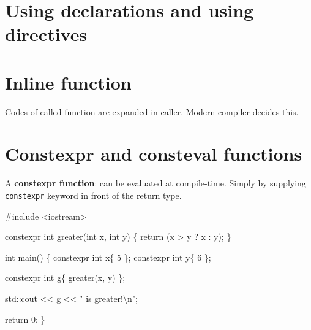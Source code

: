 \documentclass[
  letterpaper,
  DIV=11,
  numbers=noendperiod]{scrreprt}
\newenvironment{Shaded}{\begin{snugshade}}{\end{snugshade}}
\newcommand{\CommentTok}[1]{\textcolor[rgb]{0.37,0.37,0.37}{#1}}
\newcommand{\DecValTok}[1]{\textcolor[rgb]{0.68,0.00,0.00}{#1}}
\newcommand{\ErrorTok}[1]{\textcolor[rgb]{0.68,0.00,0.00}{#1}}
\newcommand{\FunctionTok}[1]{\textcolor[rgb]{0.28,0.35,0.67}{#1}}
\newcommand{\NormalTok}[1]{\textcolor[rgb]{0.00,0.23,0.31}{#1}}
\newcommand{\SpecialCharTok}[1]{\textcolor[rgb]{0.37,0.37,0.37}{#1}}
\newcommand{\StringTok}[1]{\textcolor[rgb]{0.13,0.47,0.30}{#1}}
\begin{document}
\hypertarget{using-declarations-and-using-directives}{%
\section{Using declarations and using
directives}\label{using-declarations-and-using-directives}}

\hypertarget{inline-function}{%
\section{Inline function}\label{inline-function}}

Codes of called function are expanded in caller. Modern compiler decides
this.

\hypertarget{constexpr-and-consteval-functions}{%
\section{Constexpr and consteval
functions}\label{constexpr-and-consteval-functions}}

A \textbf{constexpr function}: can be evaluated at compile-time. Simply
by supplying \texttt{constexpr} keyword in front of the return type.

\begin{Shaded}
\begin{Highlighting}[]
\CommentTok{\#include \textless{}iostream\textgreater{}}

\NormalTok{constexpr int }\FunctionTok{greater}\NormalTok{(int x, int y)}
\NormalTok{\{}
    \FunctionTok{return}\NormalTok{ (x }\SpecialCharTok{\textgreater{}}\NormalTok{ y ? x }\SpecialCharTok{:}\NormalTok{ y);}
\NormalTok{\}}

\NormalTok{int }\FunctionTok{main}\NormalTok{()}
\NormalTok{\{}
\NormalTok{    constexpr int x\{ }\DecValTok{5}\NormalTok{ \};}
\NormalTok{    constexpr int y\{ }\DecValTok{6}\NormalTok{ \};}

\NormalTok{    constexpr int g\{ }\FunctionTok{greater}\NormalTok{(x, y) \};}

\NormalTok{    std}\SpecialCharTok{::}\NormalTok{cout }\SpecialCharTok{\textless{}}\ErrorTok{\textless{}}\NormalTok{ g }\SpecialCharTok{\textless{}}\ErrorTok{\textless{}} \StringTok{" is greater!}\SpecialCharTok{\textbackslash{}n}\StringTok{"}\NormalTok{;}

\NormalTok{    return }\DecValTok{0}\NormalTok{;}
\NormalTok{\}}
\end{Highlighting}
\end{Shaded}
\end{document}
